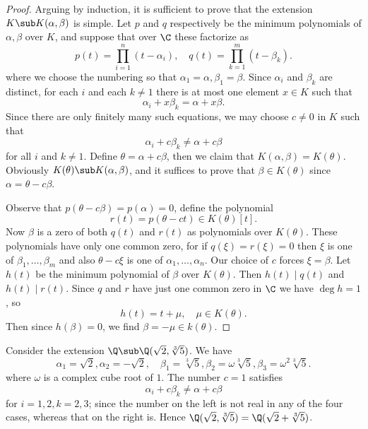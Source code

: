 \begin{proof}
Arguing by induction, it is sufficient to prove that the extension $K\sub K(\alpha,\beta)$ is simple. Let $p$ and $q$ respectively be the minimum polynomials of $\alpha,\beta$ over $K$, and suppose that over $\C$ these factorize as
\[p(t)=\prod_{i=1}^{n}(t-\alpha_i),\quad q(t)=\prod_{k=1}^{m}(t-\beta_k).\]
where we choose the numbering so that $\alpha_1=\alpha,\beta_1=\beta$. Since $\alpha_i$ and $\beta_k$ are distinct, for each $i$ and each $k\neq1$ there is
at most one element $x\in K$ such that
\[\alpha_i+x\beta_k=\alpha+x\beta.\]
Since there are only finitely many such equations, we may choose $c\neq0$ in
$K$ such that
\[\alpha_i+c\beta_k\neq\alpha+c\beta\]
for all $i$ and $k\neq 1$. Define $\theta=\alpha+c\beta$, then we claim that $K(\alpha,\beta)=K(\theta)$. Obviously $K(\theta)\sub K(\alpha,\beta)$, and it suffices to prove that $\beta\in K(\theta)$ since $\alpha=\theta-c\beta$.\par
Observe that $p(\theta-c\beta)=p(\alpha)=0$, define the polynomial
\[r(t)=p(\theta-ct)\in K(\theta)[t].\]
Now $\beta$ is a zero of both $q(t)$ and $r(t)$ as polynomials over $K(\theta)$. These polynomials have only one common zero, for if $q(\xi)=r(\xi)=0$ then $\xi$ is one of $\beta_1,\dots,\beta_m$ and also $\theta-c\xi$ is one of $\alpha_1,\dots,\alpha_n$. Our choice of $c$ forces $\xi=\beta$. Let $h(t)$ be the minimum polynomial of $\beta$ over $K(\theta)$. Then $h(t)\mid q(t)$ and $h(t)\mid r(t)$. Since $q$ and $r$ have just one common zero in $\C$ we have $\deg h=1$, so
\[h(t)=t+\mu,\quad \mu\in K(\theta).\]
Then since $h(\beta)=0$, we find $\beta=-\mu\in k(\theta)$.
\end{proof}
\begin{example}
Consider the extension $\Q\sub\Q(\sqrt{2},\sqrt[3]{5})$. We have
\[\alpha_1=\sqrt{2},\alpha_2=-\sqrt{2},\quad \beta_1=\sqrt[3]{5},\beta_2=\omega\sqrt[3]{5},\beta_3=\omega^2\sqrt[3]{5}.\]
where $\omega$ is a complex cube root of $1$. The number $c=1$ satisfies
\[\alpha_i+c\beta_k\neq\alpha+c\beta\]
for $i=1,2,k=2,3$; since the number on the left is not real in any of the
four cases, whereas that on the right is. Hence $\Q(\sqrt{2},\sqrt[3]{5})=\Q(\sqrt{2}+\sqrt[3]{5})$.
\end{example}
